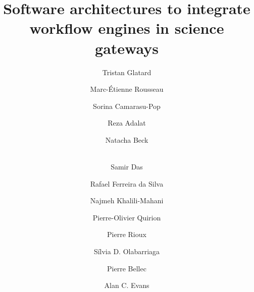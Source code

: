 \documentclass[preprint,3p,twocolumn]{elsarticle}
\begin{document}
\begin{frontmatter}



\title{Software architectures to integrate workflow engines in science gateways} 


\author[mcgill,creatis]{Tristan Glatard}
\author[mcgill]{Marc-\'Etienne Rousseau}
\author[creatis]{Sorina Camarasu-Pop}

\author[mcgill]{Reza Adalat}
\author[mcgill]{Natacha Beck}
\author[mcgill]{\\Samir Das}
\author[isi]{Rafael Ferreira da Silva}
\author[mcgill]{Najmeh Khalili-Mahani}
\author[criugm]{Pierre-Olivier Quirion}
\author[mcgill]{Pierre Rioux}
\author[amc]{S\'ilvia D. Olabarriaga}
\author[criugm]{Pierre Bellec}
\author[mcgill]{Alan C. Evans}

\address[mcgill]{McGill Centre for Integrative Neuroscience, Montreal Neurological Institute, McGill University, Canada.}
\address[creatis]{University of Lyon, CNRS, INSERM, CREATIS, Villeurbanne, France.}
\address[criugm]{Centre de Recherche de l'Institut de G\'eriatrie de Montr\'eal CRIUGM, Montr\'eal, QC, Canada.}
\address[isi]{University of Southern California, Information Sciences Institute, Marina del Rey, CA, USA.}
\address[amc]{Academic Medical Center of the University of Amsterdam, Department of Clinical Epidemiology, Biostatistics and Bioinformatics, Amsterdam, NL.}


\end{frontmatter}
\end{document}
